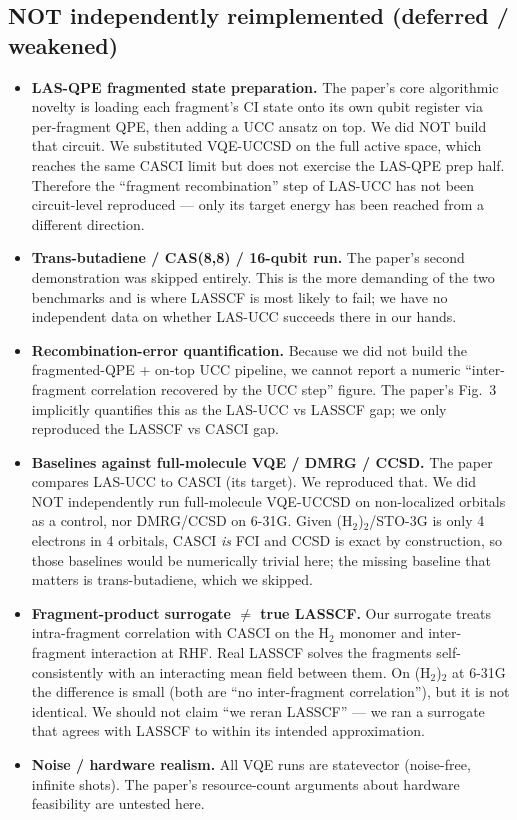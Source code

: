 \documentclass[11pt]{article}
\begin{document}
\subsection{NOT independently reimplemented (deferred / weakened)}
\begin{itemize}
    \item \textbf{LAS-QPE fragmented state preparation.} The paper's core algorithmic novelty is loading each fragment's CI state onto its own qubit register via per-fragment QPE, then adding a UCC ansatz on top. We did NOT build that circuit. We substituted VQE-UCCSD on the full active space, which reaches the same CASCI limit but does not exercise the LAS-QPE prep half. Therefore the ``fragment recombination'' step of LAS-UCC has not been circuit-level reproduced --- only its target energy has been reached from a different direction.
    \item \textbf{Trans-butadiene / CAS(8,8) / 16-qubit run.} The paper's second demonstration was skipped entirely. This is the more demanding of the two benchmarks and is where LASSCF is most likely to fail; we have no independent data on whether LAS-UCC succeeds there in our hands.
    \item \textbf{Recombination-error quantification.} Because we did not build the fragmented-QPE + on-top UCC pipeline, we cannot report a numeric ``inter-fragment correlation recovered by the UCC step'' figure. The paper's Fig.~3 implicitly quantifies this as the LAS-UCC vs LASSCF gap; we only reproduced the LASSCF vs CASCI gap.
    \item \textbf{Baselines against full-molecule VQE / DMRG / CCSD.} The paper compares LAS-UCC to CASCI (its target). We reproduced that. We did NOT independently run full-molecule VQE-UCCSD on non-localized orbitals as a control, nor DMRG/CCSD on 6-31G. Given (H$_2$)$_2$/STO-3G is only 4 electrons in 4 orbitals, CASCI \emph{is} FCI and CCSD is exact by construction, so those baselines would be numerically trivial here; the missing baseline that matters is trans-butadiene, which we skipped.
    \item \textbf{Fragment-product surrogate $\neq$ true LASSCF.} Our surrogate treats intra-fragment correlation with CASCI on the H$_2$ monomer and inter-fragment interaction at RHF. Real LASSCF solves the fragments self-consistently with an interacting mean field between them. On (H$_2$)$_2$ at 6-31G the difference is small (both are ``no inter-fragment correlation''), but it is not identical. We should not claim ``we reran LASSCF'' --- we ran a surrogate that agrees with LASSCF to within its intended approximation.
    \item \textbf{Noise / hardware realism.} All VQE runs are statevector (noise-free, infinite shots). The paper's resource-count arguments about hardware feasibility are untested here.
\end{itemize}
\end{document}
